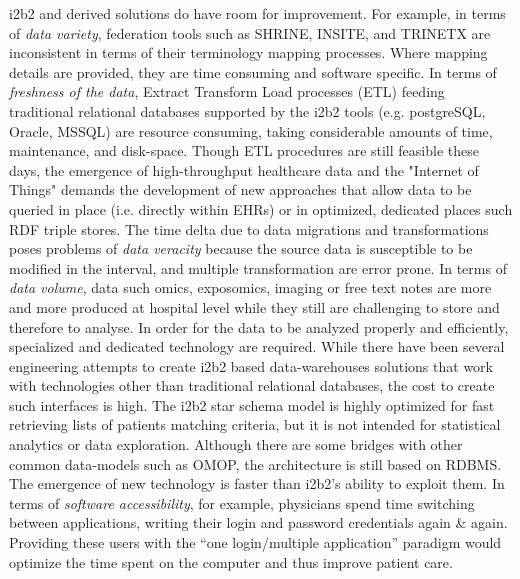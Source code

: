 \documentclass{amia}
\begin{document}
i2b2 and derived solutions do have room for improvement. For example, in terms of \textit{data variety}, federation tools such as SHRINE, INSITE, and TRINETX are inconsistent in terms of their terminology mapping processes\cite{ehr4crlesson}. Where mapping details are provided\cite{McMurry_2013}, they are time consuming and software specific\cite{Wynden__2010}. In terms of \textit{freshness of the data}, Extract Transform Load processes (ETL) feeding traditional relational databases supported by the i2b2 tools (e.g. postgreSQL, Oracle, MSSQL) are resource consuming, taking considerable amounts of time, maintenance, and disk-space. Though ETL procedures are still feasible these days, the emergence of high-throughput healthcare data and the "Internet of Things" demands the development of new approaches that allow data to be queried in place (i.e. directly within EHRs) or in optimized, dedicated places such RDF triple stores. The time delta due to data migrations and transformations poses problems of \textit{data veracity} because the source data is susceptible to be modified in the interval, and multiple transformation are error prone.  In terms of \textit{data volume}, data such omics, exposomics, imaging or free text notes are more and more produced at hospital level while they still are challenging to store and therefore to analyse. In order for the data to be analyzed properly and efficiently, specialized and dedicated technology are required. While there have been several engineering attempts to create i2b2 based data-warehouses solutions that work with technologies other than traditional relational databases\cite{Wang2014}, the cost to create such interfaces is high. The i2b2 star schema model is highly optimized for fast retrieving lists of patients matching criteria, but it is not intended for statistical analytics or data exploration\cite{pmid27577447}. Although there are some bridges with other common data-models such as OMOP, the architecture is still based on RDBMS\cite{Klann_2016}. The emergence of new technology is faster than i2b2's ability to exploit them. In terms of \textit{software accessibility}, for example, physicians spend time switching between applications, writing their login and password credentials again \& again. Providing these users with the ``one login/multiple application'' paradigm would optimize the time spent on the computer and thus improve patient care.  
\end{document}
